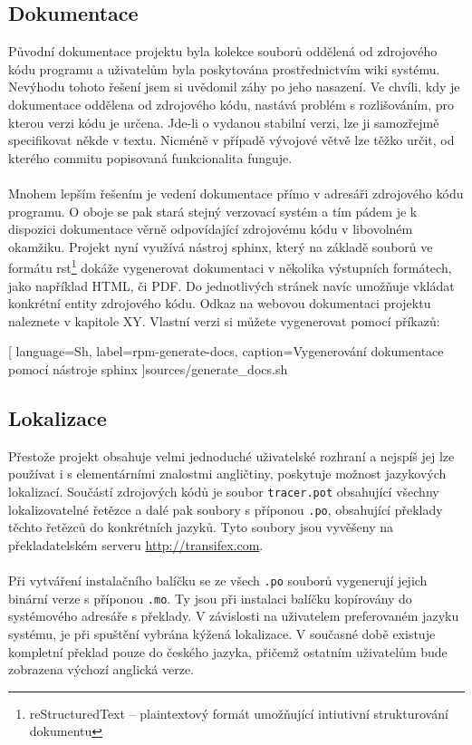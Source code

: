 \documentclass[
  field=inf,
  biblatex,
  glossaries,
  index
]{kidiplom}
\begin{document}
	\subsection{Dokumentace}
	Původní dokumentace projektu byla kolekce souborů oddělená od zdrojového kódu programu a uživatelům byla poskytována prostřednictvím wiki systému. Nevýhodu tohoto řešení jsem si uvědomil záhy po jeho nasazení. Ve chvíli, kdy je dokumentace oddělena od zdrojového kódu, nastává problém s rozlišováním, pro kterou verzi kódu je určena. Jde-li o vydanou stabilní verzi, lze ji samozřejmě specifikovat někde v textu. Nicméně v případě vývojové větvě lze těžko určit, od kterého commitu popisovaná funkcionalita funguje.
	\\
	\\
	Mnohem lepším řešením je vedení dokumentace přímo v adresáři zdrojového kódu programu. O oboje se pak stará stejný verzovací systém a tím pádem je k dispozici dokumentace věrně odpovídající zdrojovému kódu v libovolném okamžiku. Projekt nyní využívá nástroj sphinx, který na základě souborů ve formátu rst\footnote{reStructuredText -- plaintextový formát umožňující intiutivní strukturování dokumentu} dokáže vygenerovat dokumentaci v několika výstupních formátech, jako například HTML, či PDF. Do jednotlivých stránek navíc umožňuje vkládat konkrétní entity zdrojového kódu. Odkaz na webovou dokumentaci projektu naleznete v kapitole XY. Vlastní verzi si můžete vygenerovat pomocí příkazů:

	
	[
		language=Sh,
		label=rpm-generate-docs,
		caption={Vygenerování dokumentace pomocí nástroje sphinx}
	]{sources/generate_docs.sh}

	\subsection{Lokalizace}
	Přestože projekt obsahuje velmi jednoduché uživatelské rozhraní a nejspíš jej lze používat i s elementárními znalostmi angličtiny, poskytuje možnost jazykových lokalizací. Součástí zdrojových kódů je soubor \texttt{tracer.pot} obsahující všechny lokalizovatelné řetězce a dalé pak soubory s příponou \texttt{.po}, obsahující překlady těchto řetězců do konkrétních jazyků. Tyto soubory jsou vyvěšeny na překladatelském serveru \url{http://transifex.com}.
	\\
	\\
	Při vytváření instalačního balíčku se ze všech \texttt{.po} souborů vygenerují jejich binární verze s příponou \texttt{.mo}. Ty jsou při instalaci balíčku kopírovány do systémového adresáře s překlady. V závislosti na uživatelem preferovaném jazyku systému, je při spuštění vybrána kýžená lokalizace. V současné době existuje kompletní překlad pouze do českého jazyka, přičemž ostatním uživatelům bude zobrazena výchozí anglická verze.
\end{document}
